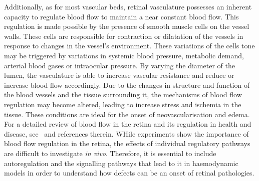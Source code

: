 \documentclass[12pt,a4paper]{article}
\begin{document}
Additionally, as for most vascular beds, retinal vasculature possesses an inherent capacity to regulate blood flow to maintain a near constant blood flow.
This regulation is made possible by the presence of smooth muscle cells on the vessel walls.
These cells are responsible for contraction or dilatation of the vessels in response to changes in the vessel's environment.
These variations of the cells tone may be triggered by variations in systemic blood pressure, metabolic demand, arterial blood gases or intraocular pressure.
By varying the diameter of the lumen, the vasculature is able to increase vascular resistance and reduce or increase blood flow accordingly. 
Due to the changes in structure and function of the blood vessels and the tissue surrounding it, the mechanisms of blood flow regulation may become altered, leading to increase stress and ischemia in the tissue.
These conditions are ideal for the onset of neovascularisation and edema.
For a detailed review of blood flow in the retina and its regulation in health and disease, see~\cite{Pournaras_2008} and references therein.
WHile experiments show the importance of blood flow regulation in the retina, the effects of individual regulatory pathways are difficult to investigate \textit{in vivo}. 
Therefore, it is essential to include autoregulation and the signalling pathways that lead to it in haemodynamic models in order to understand how defects can be an onset of retinal pathologies.\\
\end{document}
